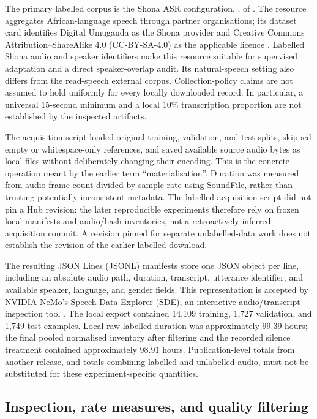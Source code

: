 \documentclass[12pt,a4paper]{report}
\newcommand{\code}[1]{\texttt{\detokenize{#1}}}
\begin{document}
The primary labelled corpus is the Shona ASR configuration, \code{sna_asr}, of \code{google/WaxalNLP}. The resource aggregates African-language speech through partner organisations; its dataset card identifies Digital Umuganda as the Shona provider and Creative Commons Attribution--ShareAlike 4.0 (CC-BY-SA-4.0) as the applicable licence \citep{WaxalDataset}. Labelled Shona audio and speaker identifiers make this resource suitable for supervised adaptation and a direct speaker-overlap audit. Its natural-speech setting also differs from the read-speech external corpus. Collection-policy claims are not assumed to hold uniformly for every locally downloaded record. In particular, a universal 15-second minimum and a local 10\% transcription proportion are not established by the inspected artifacts.

The acquisition script loaded original training, validation, and test splits, skipped empty or whitespace-only references, and saved available source audio bytes as local files without deliberately changing their encoding. This is the concrete operation meant by the earlier term ``materialisation''. Duration was measured from audio frame count divided by sample rate using SoundFile, rather than trusting potentially inconsistent metadata. The labelled acquisition script did not pin a Hub revision; the later reproducible experiments therefore rely on frozen local manifests and audio/hash inventories, not a retroactively inferred acquisition commit. A revision pinned for separate unlabelled-data work does not establish the revision of the earlier labelled download.

The resulting JSON Lines (JSONL) manifests store one JSON object per line, including an absolute audio path, duration, transcript, utterance identifier, and available speaker, language, and gender fields. This representation is accepted by NVIDIA NeMo's Speech Data Explorer (SDE), an interactive audio/transcript inspection tool \citep{NeMoSDE}. The local export contained 14,109 training, 1,727 validation, and 1,749 test examples. Local raw labelled duration was approximately 99.39 hours; the final pooled normalised inventory after filtering and the recorded silence treatment contained approximately 98.91 hours. Publication-level totals from another release, and totals combining labelled and unlabelled audio, must not be substituted for these experiment-specific quantities.

\subsection{Inspection, rate measures, and quality filtering}
\end{document}
